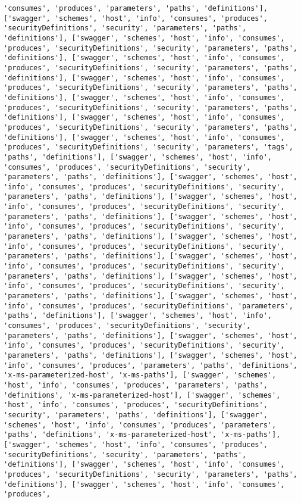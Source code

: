 \documentclass[11pt]{article}
\begin{document}
\begin{Verbatim}[commandchars=\\\{\}]
'consumes', 'produces', 'parameters', 'paths', 'definitions'], ['swagger', 'schemes', 'host', 'info', 'consumes', 'produces', 'securityDefinitions', 'security', 'parameters', 'paths', 'definitions'], ['swagger', 'schemes', 'host', 'info', 'consumes', 'produces', 'securityDefinitions', 'security', 'parameters', 'paths', 'definitions'], ['swagger', 'schemes', 'host', 'info', 'consumes', 'produces', 'securityDefinitions', 'security', 'parameters', 'paths', 'definitions'], ['swagger', 'schemes', 'host', 'info', 'consumes', 'produces', 'securityDefinitions', 'security', 'parameters', 'paths', 'definitions'], ['swagger', 'schemes', 'host', 'info', 'consumes', 'produces', 'securityDefinitions', 'security', 'parameters', 'paths', 'definitions'], ['swagger', 'schemes', 'host', 'info', 'consumes', 'produces', 'securityDefinitions', 'security', 'parameters', 'paths', 'definitions'], ['swagger', 'schemes', 'host', 'info', 'consumes', 'produces', 'securityDefinitions', 'security', 'parameters', 'tags', 'paths', 'definitions'], ['swagger', 'schemes', 'host', 'info', 'consumes', 'produces', 'securityDefinitions', 'security', 'parameters', 'paths', 'definitions'], ['swagger', 'schemes', 'host', 'info', 'consumes', 'produces', 'securityDefinitions', 'security', 'parameters', 'paths', 'definitions'], ['swagger', 'schemes', 'host', 'info', 'consumes', 'produces', 'securityDefinitions', 'security', 'parameters', 'paths', 'definitions'], ['swagger', 'schemes', 'host', 'info', 'consumes', 'produces', 'securityDefinitions', 'security', 'parameters', 'paths', 'definitions'], ['swagger', 'schemes', 'host', 'info', 'consumes', 'produces', 'securityDefinitions', 'security', 'parameters', 'paths', 'definitions'], ['swagger', 'schemes', 'host', 'info', 'consumes', 'produces', 'securityDefinitions', 'security', 'parameters', 'paths', 'definitions'], ['swagger', 'schemes', 'host', 'info', 'consumes', 'produces', 'securityDefinitions', 'security', 'parameters', 'paths', 'definitions'], ['swagger', 'schemes', 'host', 'info', 'consumes', 'produces', 'securityDefinitions', 'parameters', 'paths', 'definitions'], ['swagger', 'schemes', 'host', 'info', 'consumes', 'produces', 'securityDefinitions', 'security', 'parameters', 'paths', 'definitions'], ['swagger', 'schemes', 'host', 'info', 'consumes', 'produces', 'securityDefinitions', 'security', 'parameters', 'paths', 'definitions'], ['swagger', 'schemes', 'host', 'info', 'consumes', 'produces', 'parameters', 'paths', 'definitions', 'x-ms-parameterized-host', 'x-ms-paths'], ['swagger', 'schemes', 'host', 'info', 'consumes', 'produces', 'parameters', 'paths', 'definitions', 'x-ms-parameterized-host'], ['swagger', 'schemes', 'host', 'info', 'consumes', 'produces', 'securityDefinitions', 'security', 'parameters', 'paths', 'definitions'], ['swagger', 'schemes', 'host', 'info', 'consumes', 'produces', 'parameters', 'paths', 'definitions', 'x-ms-parameterized-host', 'x-ms-paths'], ['swagger', 'schemes', 'host', 'info', 'consumes', 'produces', 'securityDefinitions', 'security', 'parameters', 'paths', 'definitions'], ['swagger', 'schemes', 'host', 'info', 'consumes', 'produces', 'securityDefinitions', 'security', 'parameters', 'paths', 'definitions'], ['swagger', 'schemes', 'host', 'info', 'consumes', 'produces', 
\end{Verbatim}
\end{document}
